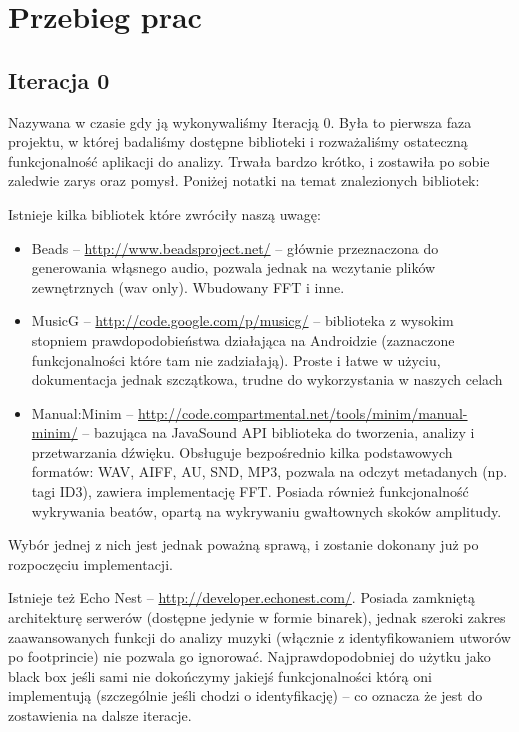 \chapter{Przebieg prac}

\section{Iteracja 0}
Nazywana w czasie gdy ją wykonywaliśmy Iteracją 0. Była to pierwsza faza projektu, w której badaliśmy dostępne biblioteki i rozważaliśmy ostateczną funkcjonalność aplikacji do analizy. Trwała bardzo krótko, i zostawiła po sobie zaledwie zarys oraz pomysł. Poniżej notatki na temat znalezionych bibliotek:

\begin{Note}

Istnieje kilka bibliotek które zwróciły naszą uwagę:

\begin{itemize}
  \item Beads -- \url{http://www.beadsproject.net/} -- głównie przeznaczona do generowania włąsnego audio, pozwala jednak na wczytanie plików zewnętrznych (wav only). Wbudowany FFT i inne.
  \item MusicG -- \url{http://code.google.com/p/musicg/} -- biblioteka z wysokim stopniem prawdopodobieństwa działająca na Androidzie (zaznaczone funkcjonalności które tam nie zadziałają). Proste i łatwe w użyciu, dokumentacja jednak szczątkowa, trudne do wykorzystania w naszych celach
  \item Manual:Minim -- \url{http://code.compartmental.net/tools/minim/manual-minim/} -- bazująca na JavaSound API biblioteka do tworzenia, analizy i przetwarzania dźwięku. Obsługuje bezpośrednio kilka podstawowych formatów: WAV, AIFF, AU, SND, MP3, pozwala na odczyt metadanych (np. tagi ID3), zawiera implementację FFT. Posiada również funkcjonalność wykrywania beatów, opartą na wykrywaniu gwałtownych skoków amplitudy.
\end{itemize}

Wybór jednej z nich jest jednak poważną sprawą, i zostanie dokonany już po rozpoczęciu implementacji.

Istnieje też Echo Nest -- \url{http://developer.echonest.com/}. Posiada zamkniętą architekturę
serwerów (dostępne jedynie w formie binarek), jednak szeroki zakres zaawansowanych funkcji do
analizy muzyki (włącznie z identyfikowaniem utworów po footprincie) nie pozwala go ignorować.
Najprawdopodobniej do użytku jako black box jeśli sami nie dokończymy jakiejś funkcjonalności którą
oni implementują (szczególnie jeśli chodzi o identyfikację) -- co oznacza że jest do zostawienia na dalsze iteracje.

\end{Note}

